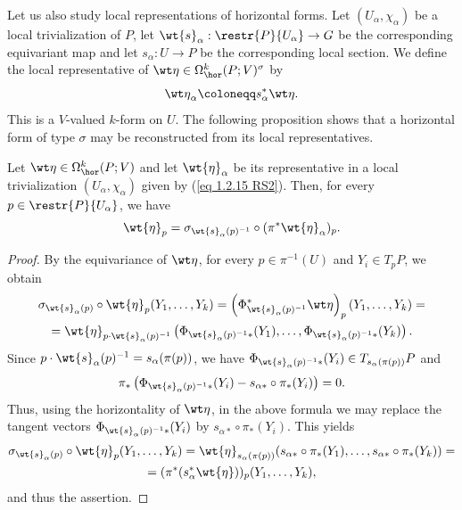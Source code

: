 Let us also study local representations of horizontal forms. Let $(U_\alpha,\chi_\alpha)$ be a local trivialization of $P$, let $\wt{s}_\alpha:\restr{P}{U_\alpha}\to G$ be the corresponding equivariant map and let $s_\alpha:U\to P$ be the corresponding local section. We define the local representative of $\wt\eta\in\Omega^k_{\hor}(P;V)^\sigma$ by
\[{\wt\eta}_\alpha\coloneqq s_\alpha^\ast\wt\eta.\label{eq 1.2.15 RS2}\]
This is a $V$-valued  $k$-form on $U$. The following proposition shows that a horizontal form of type $\sigma$ may be reconstructed from its local representatives.

\begin{prop}[{{\cite[Prop.~1.2.14]{RS2}}}]
    Let $\wt\eta\in \Omega^k_{\hor}(P;V)$ and let $\wt{\eta}_\alpha$ be its representative in a local trivialization $(U_\alpha,\chi_\alpha)$ given by (\ref{eq 1.2.15 RS2}). Then, for every $p\in \restr{P}{U_\alpha}$, we have
    \[\wt{\eta}_p=\sigma_{\wt{s}_\alpha(p)^{-1}}\circ (\pi^\ast \wt{\eta}_\alpha)_p.\label{eq 1.2.16 RS2}\]
\end{prop}
\begin{proof}
    By the equivariance of $\wt\eta$, for every $p\in \pi^{-1}(U)$ and $Y_i\in T_pP$, we obtain
    \begin{multline}
        \sigma_{\wt{s}_\alpha(p)}\circ \wt{\eta}_p(Y_1,\ldots,Y_k)=\left(\Phi_{\wt{s}_\alpha(p)^{-1}}^\ast \wt\eta\right)_p (Y_1,\ldots,Y_k)=\\= \wt{\eta}_{p\cdot \wt{s}_\alpha(p)^{-1}} \left(\Phi_{\wt{s}_\alpha(p)^{-1}\ast}(Y_1),\ldots, \Phi_{\wt{s}_\alpha(p)^{-1}\ast}(Y_k) \right).
    \end{multline}
    Since $p\cdot \wt{s}_\alpha(p)^{-1}=s_\alpha(\pi(p))$, we have $\Phi_{\wt{s}_\alpha(p)^{-1}\ast}(Y_i)\in T_{s_\alpha(\pi(p))}P$ and
    \[\pi_\ast\left(\Phi_{\wt{s}_\alpha(p)^{-1}\ast}(Y_i)-s_{\alpha\ast}\circ \pi_\ast(Y_i)\right)=0.\]
    Thus, using the horizontality of $\wt\eta$, in the above formula we may replace the tangent vectors $\Phi_{\wt{s}_\alpha(p)^{-1}\ast}(Y_i)$ by $s_{\alpha\ast}\circ\pi_\ast(Y_i)$. This yields
    \begin{multline}
        \sigma_{\wt{s}_\alpha(p)}\circ \wt{\eta}_p(Y_1,\ldots,Y_k)=\wt{\eta}_{s_\alpha(\pi(p))}(s_{\alpha\ast}\circ \pi_\ast(Y_1),\ldots,s_{\alpha\ast}\circ\pi_\ast(Y_k))=\\
        =(\pi^\ast(s_\alpha^\ast \wt{\eta}))_p(Y_1,\ldots,Y_k),
    \end{multline}
    and thus the assertion.
\end{proof}

